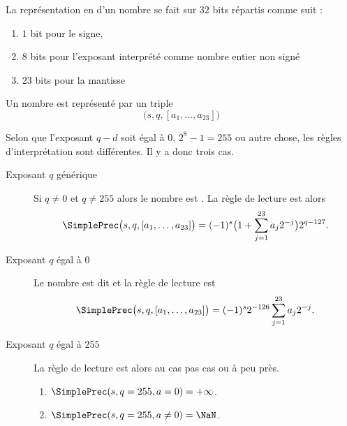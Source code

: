 \begin{definition}        \label{DEFooEIOZooYLDVjs}
    La représentation en  d'un nombre se fait sur \( 32\) bits répartis comme suit :
    \begin{enumerate}
        \item
            \( 1\) bit pour le signe,
        \item
            \( 8\) bits pour l'exposant interprété comme nombre entier non signé
        \item
            \( 23\) bits pour la mantisse
    \end{enumerate}

    Un nombre est représenté par un triple
    \begin{equation}
        \big( s,q,[a_1,\ldots, a_{23}] \big)
    \end{equation}

    Selon que l'exposant \( q-d\) soit égal à \( 0\), \( 2^8-1=255\) ou autre chose, les règles d'interprétation sont différentes. Il y a donc trois cas.
    \begin{description}
        \item[Exposant \( q\) générique\cite{ooMPTNooYbSwJS}] 
           Si \( q\neq 0\) et \( q\neq 255\) alors le nombre est . La règle de lecture est alors
           \begin{equation}        \label{EQooEFEKooIrUaKj}
                \SimplePrec\big( s,q,[a_1,\ldots, a_{23}] \big)=(-1)^s\big( 1+\sum_{j=1}^{23}a_j2^{-j} \big)2^{q-127}.
            \end{equation}
        \item[Exposant \( q\) égal à \( 0\)] Le nombre est dit  et la règle de lecture est
            \begin{equation}        \label{EQooRTBFooIplydi}
                \SimplePrec\big( s,q,[a_1,\ldots, a_{23}] \big)=(-1)^s2^{-126}\sum_{j=1}^{23}a_j2^{-j}.
            \end{equation}
        \item[Exposant \( q\) égal à \( 255\)]
            La règle de lecture est alors au cas pas cas ou à peu près.
            \begin{enumerate}
                \item
                    \( \SimplePrec(s,q=255,a=0)=+\infty\).
                \item
                    \( \SimplePrec(s,q=255,a\neq 0)=\NaN\).
            \end{enumerate}
    \end{description}
\end{definition}

